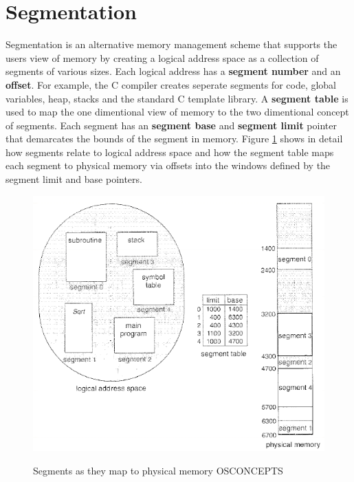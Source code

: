 \documentclass[10pt,a4paper]{article}
\begin{document}
\section{Segmentation}
Segmentation is an alternative memory management scheme that supports the users view of memory by creating a logical address space as a collection of segments of various sizes. Each logical address has a {\bf segment number} and an {\bf offset}. For example, the C compiler creates seperate segments for code, global variables, heap, stacks and the standard C template library. A {\bf segment table} is used to map the one dimentional view of memory to the two dimentional concept of segments. Each segment has an {\bf segment base} and {\bf segment limit} pointer that demarcates the bounds of the segment in memory. Figure \ref{seg} shows in detail how segments relate to logical address space and how the segment table maps each segment to physical memory via offsets into the windows defined by the segment limit and base pointers.
\begin{figure}
\caption{Segments as they map to physical memory {OSCONCEPTS}}
\begin{center}
\includegraphics[scale=0.45]{../images/segmentation.png}
\label{seg}
\end{center}
\end{figure}
\end{document}
